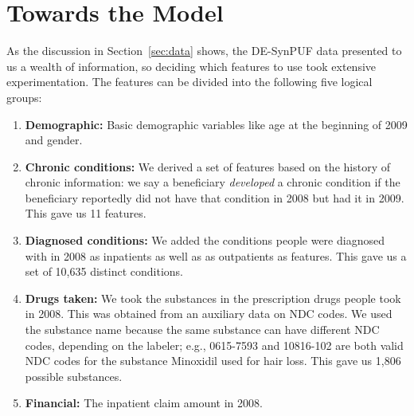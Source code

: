 \section{Towards the Model}
\label{sec:towardsmodel}
As the discussion in Section~\ref{sec:data} shows, the DE-SynPUF data presented to us a wealth of information, so deciding which features to use took extensive experimentation. The features can be divided into the following five logical groups:
\begin{enumerate}
\item {\bf Demographic: } Basic demographic variables like age at the beginning of 2009 and gender.
\item {\bf Chronic conditions: }We derived a set of features based on the history of chronic information: we say a beneficiary {\em developed} a chronic condition if the beneficiary reportedly did not have that condition in 2008 but had it in 2009. This gave us 11 features.
\item {\bf Diagnosed conditions: }We added the conditions people were diagnosed with in 2008 as inpatients as well as as outpatients as features. This gave us a set of 10,635 distinct conditions. 
\item {\bf Drugs taken: }We took the substances in the prescription drugs people took in 2008. This was obtained from an auxiliary data on NDC codes. We used the substance name because the same substance can have different NDC codes, depending on the labeler; e.g., 0615-7593 and 10816-102 are both valid NDC codes for the substance Minoxidil used for hair loss. This gave us 1,806 possible substances.
\item {\bf Financial: } The inpatient claim amount in 2008.
\end{enumerate}

